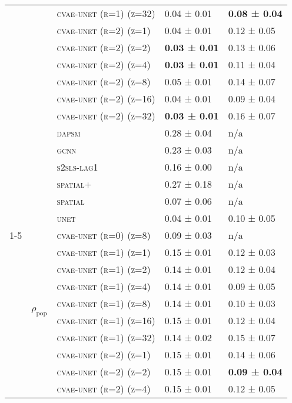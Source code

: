 \documentclass{article}
\begin{document}
\begin{table}[!tbp]
\begin{tabular}{lllll}
 &  & \textsc{cvae-unet (r=1) (z=32)} & 0.04 ± { 0.01} & \bf 0.08 ± { 0.04} \\
 &  & \textsc{cvae-unet (r=2) (z=1)} & 0.04 ± { 0.01} & 0.12 ± { 0.05} \\
 &  & \textsc{cvae-unet (r=2) (z=2)} & \bf 0.03 ± { 0.01} & 0.13 ± { 0.06} \\
 &  & \textsc{cvae-unet (r=2) (z=4)} & \bf 0.03 ± { 0.01} & 0.11 ± { 0.04} \\
 &  & \textsc{cvae-unet (r=2) (z=8)} & 0.05 ± { 0.01} & 0.14 ± { 0.07} \\
 &  & \textsc{cvae-unet (r=2) (z=16)} & 0.04 ± { 0.01} & 0.09 ± { 0.04} \\
 &  & \textsc{cvae-unet (r=2) (z=32)} & \bf 0.03 ± { 0.01} & 0.16 ± { 0.07} \\
 &  & \textsc{dapsm} & 0.28 ± { 0.04} & n/a \\
 &  & \textsc{gcnn} & 0.23 ± { 0.03} & n/a \\
 &  & \textsc{s2sls-lag1} & 0.16 ± { 0.00} & n/a \\
 &  & \textsc{spatial+} & 0.27 ± { 0.18} & n/a \\
 &  & \textsc{spatial} & 0.07 ± { 0.06} & n/a \\
 &  & \textsc{unet} & 0.04 ± { 0.01} & 0.10 ± { 0.05} \\
\cline{1-5} \cline{2-5}
\multirow[t]{38}{*}{$ (SC)\; PM\_{2.5} \;\to\; m \;(r=2) $} & \multirow[t]{19}{*}{$\rho_{\text{pop}}$} & \textsc{cvae-unet (r=0) (z=8)} & 0.09 ± { 0.03} & n/a \\
 &  & \textsc{cvae-unet (r=1) (z=1)} & 0.15 ± { 0.01} & 0.12 ± { 0.03} \\
 &  & \textsc{cvae-unet (r=1) (z=2)} & 0.14 ± { 0.01} & 0.12 ± { 0.04} \\
 &  & \textsc{cvae-unet (r=1) (z=4)} & 0.14 ± { 0.01} & 0.09 ± { 0.05} \\
 &  & \textsc{cvae-unet (r=1) (z=8)} & 0.14 ± { 0.01} & 0.10 ± { 0.03} \\
 &  & \textsc{cvae-unet (r=1) (z=16)} & 0.15 ± { 0.01} & 0.12 ± { 0.04} \\
 &  & \textsc{cvae-unet (r=1) (z=32)} & 0.14 ± { 0.02} & 0.15 ± { 0.07} \\
 &  & \textsc{cvae-unet (r=2) (z=1)} & 0.15 ± { 0.01} & 0.14 ± { 0.06} \\
 &  & \textsc{cvae-unet (r=2) (z=2)} & 0.15 ± { 0.01} & \bf 0.09 ± { 0.04} \\
 &  & \textsc{cvae-unet (r=2) (z=4)} & 0.15 ± { 0.01} & 0.12 ± { 0.05} \\

\end{tabular}
\end{table}
\end{document}
